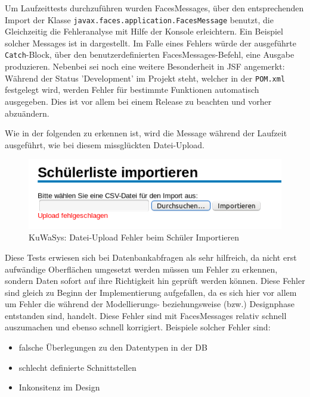 \documentclass[12pt, twoside, a4paper, ngerman]{article}
\begin{document}
Um Laufzeittests durchzuführen wurden FacesMessages, über den entsprechenden Import der Klasse \texttt{javax.faces.application.FacesMessage} benutzt, die Gleichzeitig die Fehleranalyse mit Hilfe der Konsole erleichtern.
Ein Beispiel solcher Messages ist in  dargestellt. Im Falle eines Fehlers würde der ausgeführte \texttt{Catch}-Block, über den benutzerdefinierten FacesMessages-Befehl, eine Ausgabe produzieren.
Nebenbei sei noch eine weitere Besonderheit in JSF angemerkt:
Während der Status 'Development' im  Projekt steht, welcher in der \texttt{POM.xml} festgelegt wird, werden Fehler für bestimmte Funktionen automatisch ausgegeben. Dies ist vor allem bei einem Release zu beachten und vorher abzuändern.

	
	
Wie in der folgenden  zu erkennen ist, wird die Message während der Laufzeit ausgeführt, wie bei diesem missglückten Datei-Upload.

\begin{figure}[H]
 \begin{center}
   \includegraphics[scale=0.8]{img/SchulerImportieren_KuWaSys.png}
 \end{center}
 \caption[\textbf{KuWaSys: Datei-Upload Fehler beim Schüler Importieren}]{KuWaSys: Datei-Upload Fehler beim Schüler Importieren}
 \label{figmin:SchulerImportieren_KuWaSys}
 \label{fig:SchulerImportieren_KuWaSys}
\end{figure}

Diese Tests erwiesen sich bei Datenbankabfragen als sehr hilfreich, da nicht erst aufwändige Oberflächen umgesetzt werden müssen um Fehler zu erkennen, sondern Daten sofort auf ihre Richtigkeit hin geprüft werden können.
Diese Fehler sind gleich zu Beginn der Implementierung aufgefallen, da es sich hier vor allem um Fehler die während der Modellierungs- beziehungsweise (bzw.) Designphase entstanden sind, handelt. Diese Fehler sind mit FacesMessages relativ schnell auszumachen und ebenso schnell korrigiert. Beispiele solcher Fehler sind:
\begin{itemize}
  \item falsche Überlegungen zu den Datentypen in der \ac{DB}
  \item schlecht definierte Schnittstellen
  \item Inkonsitenz im Design 
\end{itemize}
\end{document}

